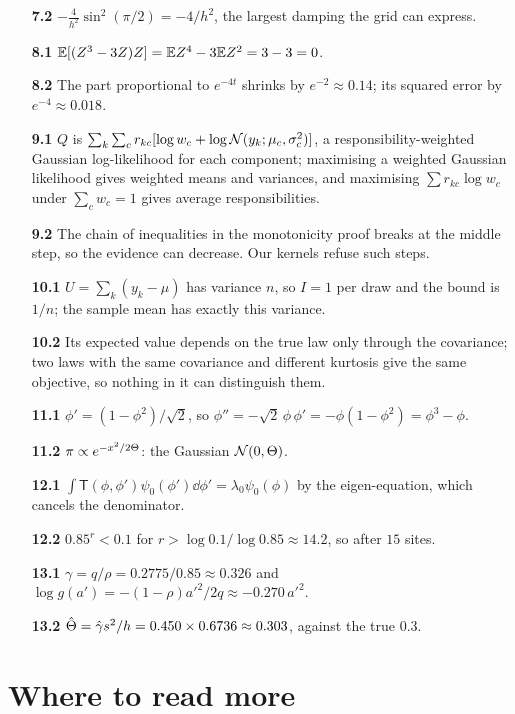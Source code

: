 \begin{itemize}[leftmargin=2.6em,labelwidth=2.2em,align=left,itemsep=0.25em]
\item[\textbf{7.2}] $-\tfrac4{h^2}\sin^2(\pi/2)=-4/h^2$, the largest damping the grid can express.
\item[\textbf{8.1}] $\mathbb{E}[(Z^3-3Z)Z]=\mathbb{E} Z^4-3\mathbb{E} Z^2=3-3=0$.
\item[\textbf{8.2}] The part proportional to $e^{-4t}$ shrinks by $e^{-2}\approx0.14$; its squared error by $e^{-4}\approx0.018$.
\item[\textbf{9.1}] $Q$ is $\sum_k\sum_cr_{kc}[\log w_c+\log\mathcal{N}(y_k;\mu_c,\sigma_c^2)]$, a responsibility-weighted Gaussian log-likelihood for each
  component; maximising a weighted Gaussian likelihood gives weighted means and variances, and maximising
  $\sum r_{kc}\log w_c$ under $\sum_cw_c=1$ gives average responsibilities.
\item[\textbf{9.2}] The chain of inequalities in the monotonicity proof breaks at the middle step, so the evidence can
  decrease. Our kernels refuse such steps.
\item[\textbf{10.1}] $U=\sum_k(y_k-\mu)$ has variance $n$, so $I=1$ per draw and the bound is $1/n$; the sample mean has exactly this
  variance.
\item[\textbf{10.2}] Its expected value depends on the true law only through the covariance; two laws with the same
  covariance and different kurtosis give the same objective, so nothing in it can distinguish them.
\item[\textbf{11.1}] $\phi'=(1-\phi^2)/\sqrt2$, so $\phi''=-\sqrt2\,\phi\,\phi'=-\phi(1-\phi^2)=\phi^3-\phi$.
\item[\textbf{11.2}] $\pi\propto e^{-x^2/2\Theta}$: the Gaussian $\mathcal{N}(0,\Theta)$.
\item[\textbf{12.1}] $\int\mathsf T(\phi,\phi')\psi_0(\phi')\dd\phi'=\lambda_0\psi_0(\phi)$ by the eigen-equation, which cancels the denominator.
\item[\textbf{12.2}] $0.85^r<0.1$ for $r>\log0.1/\log0.85\approx14.2$, so after $15$ sites.
\item[\textbf{13.1}] $\gamma=q/\rho=0.2775/0.85\approx0.326$ and $\log g(a')=-(1-\rho)a'^2/2q\approx-0.270\,a'^2$.
\item[\textbf{13.2}] $\hat{\Theta}=\hat\gamma s^2/h=0.450\times0.6736\approx0.303$, against the true $0.3$.
\end{itemize}

\section{Where to read more}
\sloppy

